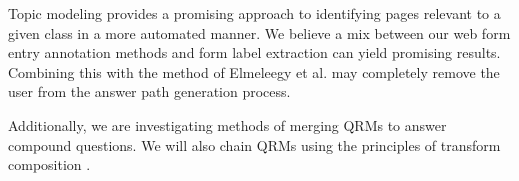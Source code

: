 Topic modeling provides a promising approach to identifying pages relevant to a given class in a more automated manner. We believe a mix between our web form entry annotation methods and form label extraction \cite{1453931} can yield promising results. Combining this with the method of Elmeleegy et al. \cite{1687749} may completely remove the user from the answer path generation process.

Additionally, we are investigating methods of merging QRMs to answer compound questions.  We will also chain QRMs using the principles of transform composition \cite{transformscout}.


